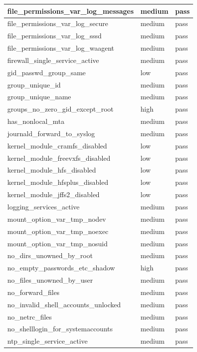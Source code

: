 \begin{longtable}{|p{10cm}|p{2cm}|p{2cm}|}
\hline
file\_permissions\_var\_log\_messages & medium & pass \\
\hline
file\_permissions\_var\_log\_secure & medium & pass \\
\hline
file\_permissions\_var\_log\_sssd & medium & pass \\
\hline
file\_permissions\_var\_log\_waagent & medium & pass \\
\hline
firewall\_single\_service\_active & medium & pass \\
\hline
gid\_passwd\_group\_same & low & pass \\
\hline
group\_unique\_id & medium & pass \\
\hline
group\_unique\_name & medium & pass \\
\hline
groups\_no\_zero\_gid\_except\_root & high & pass \\
\hline
has\_nonlocal\_mta & medium & pass \\
\hline
journald\_forward\_to\_syslog & medium & pass \\
\hline
kernel\_module\_cramfs\_disabled & low & pass \\
\hline
kernel\_module\_freevxfs\_disabled & low & pass \\
\hline
kernel\_module\_hfs\_disabled & low & pass \\
\hline
kernel\_module\_hfsplus\_disabled & low & pass \\
\hline
kernel\_module\_jffs2\_disabled & low & pass \\
\hline
logging\_services\_active & medium & pass \\
\hline
mount\_option\_var\_tmp\_nodev & medium & pass \\
\hline
mount\_option\_var\_tmp\_noexec & medium & pass \\
\hline
mount\_option\_var\_tmp\_nosuid & medium & pass \\
\hline
no\_dirs\_unowned\_by\_root & medium & pass \\
\hline
no\_empty\_passwords\_etc\_shadow & high & pass \\
\hline
no\_files\_unowned\_by\_user & medium & pass \\
\hline
no\_forward\_files & medium & pass \\
\hline
no\_invalid\_shell\_accounts\_unlocked & medium & pass \\
\hline
no\_netrc\_files & medium & pass \\
\hline
no\_shelllogin\_for\_systemaccounts & medium & pass \\
\hline
ntp\_single\_service\_active & medium & pass \\

\end{longtable}
